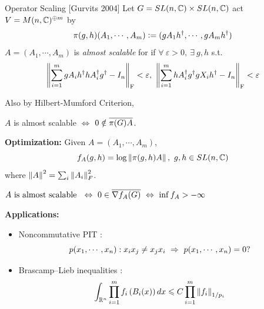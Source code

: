 \documentclass{beamer}
\begin{document}
	\begin{frame}{Operator Scaling [Gurvits\nocite{key15} 2004]}
		Let $G = SL(n,\mathbb{C}) \times SL(n,\mathbb{C})$ act $V = M(n,\mathbb{C})^{\oplus m}$ by
		\begin{equation*}
			\pi(g,h) (A_1,\cdots,A_m) \vcentcolon= (gA_1h^{\dagger},\cdots,gA_mh^{\dagger})
		\end{equation*}
		$A = (A_1,\cdots,A_m)$ is \emph{almost scalable} for if $\forall~\varepsilon > 0,~\exists~g,h$ s.t.
		\begin{equation*}
			\left\lVert\sum_{i=1}^mgA_ih^{\dagger}hA_i^{\dagger}g^{\dagger}-I_n\right\lVert_{\operatorname{F}} < \varepsilon,~\left\lVert\sum_{i=1}^mhA_i^{\dagger}g^{\dagger}gX_ih^{\dagger}-I_n\right\lVert_{\operatorname{F}} < \varepsilon
		\end{equation*}
	
		Also by Hilbert-Mumford Criterion,
		\begin{thm}
			\begin{center}
				$A$ is almost scalable $\Leftrightarrow$ $0 \notin \overline{\pi(G)A}$.
			\end{center}
		\end{thm}
	\end{frame}

	\begin{frame}
	 		\textbf{Optimization:} Given $A = (A_1,\cdots,A_m)$,
			\begin{equation*}
				f_A(g,h) = \log \left\lVert\pi(g,h)A\right\lVert,~g,h \in SL(n,\mathbb{C})
			\end{equation*}
			where  $\left\lVert A\right\lVert^2 = \sum_i \left\lVert A_i\right\lVert_F^2$.
			\begin{thm}
				\begin{center}
					$A \text{ is almost scalable } ~\Leftrightarrow~ 0 \in \overline{\nabla f_A(G)} ~\Leftrightarrow~ \inf f_A > -\infty$
				\end{center}
			\end{thm}
			\textbf{Applications:} 
			\begin{itemize}
				\item Noncommutative PIT \cite{key13}:
				\vspace{-0.5em}
				\begin{equation*}
					p(x_1,\cdots,x_n): x_ix_j \neq x_jx_i~\Rightarrow~ p(x_1,\cdots,x_n) = 0?
					\vspace{-0.5em}
				\end{equation*}
				\item Brascamp–Lieb inequalities \cite{key22}: 
				\vspace{-0.5em}
				\begin{equation*}
					\int_{\R^n} \prod_{i=1}^mf_i\bc{B_i(x)} dx \leqslant C \prod_{i=1}^m \norm{f_i}_{1/p_i}
					\vspace{-0.5em}
				\end{equation*}
			\end{itemize}
	\end{frame}
\end{document}
